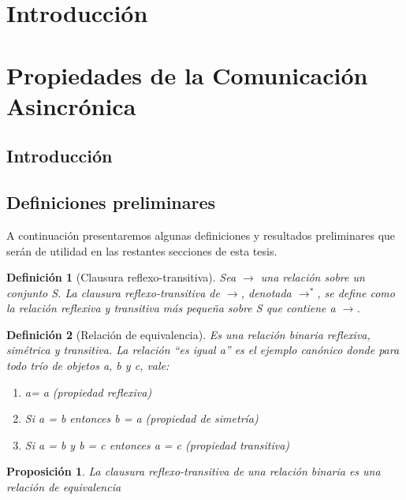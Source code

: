 \documentclass[paper=a4, fontsize=11pt, spanish]{scrartcl} %
\numberwithin{equation}{section} %
\numberwithin{figure}{section} %
\numberwithin{table}{section} %
\newtheorem{definition}{Definición}
\newtheorem{prop}{Proposición}
\begin{document}
\begin{abstract}

\end{abstract}

\section{Introducción}

\section{Propiedades de la Comunicación Asincrónica}
\subsection{Introducción}


\subsection{Definiciones preliminares}
\label{preliminares}
A continuación presentaremos algunas definiciones y resultados preliminares que serán de utilidad en las restantes secciones de esta tesis.

\begin{definition}[Clausura reflexo-transitiva] Sea $\rightarrow$ una relación sobre un conjunto S. La clausura reflexo-transitiva de $\rightarrow$, denotada  $\rightarrow^*$, se define como la relación reflexiva y transitiva más pequeña sobre S que contiene a $\rightarrow$. 
\end{definition} 
\begin{definition}[Relación de equivalencia] Es una relación binaria reflexiva, simétrica y transitiva. La relación ``es igual a''  es el ejemplo canónico donde para todo trío de objetos a, b y c, vale: 

\begin{enumerate}
    \item a= a (propiedad reflexiva)
    \item Si a = b entonces b = a (propiedad de simetría)
    \item Si a = b y b = c entonces a = c (propiedad transitiva)
\end{enumerate}
\end{definition}

\begin{prop}
 La clausura reflexo-transitiva de una relación binaria es una relación de equivalencia
\end{prop}
\end{document}
